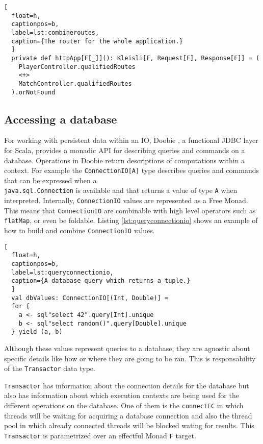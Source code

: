 \documentclass[../main.tex]{subfiles}
\begin{document}
\begin{lstlisting}[
  float=h,
  captionpos=b,
  label=lst:combineroutes,
  caption={The router for the whole application.}
  ]
  private def httpApp[F[_]](): Kleisli[F, Request[F], Response[F]] = (
    PlayerController.qualifiedRoutes
    <+>
    MatchController.qualifiedRoutes
  ).orNotFound
\end{lstlisting}

\subsection{Accessing a database}
For working with persistent data within an IO, Doobie \autocite{Norris2020Doobie}, a functional JDBC layer for Scala,
provides a monadic API for describing
queries and commands on a database. Operations in Doobie return descriptions of
computations within a context. For example the \texttt{ConnectionIO[A]} type
describes queries and commands that can be expressed when a\\
\texttt{java.sql.Connection} is available and that returns a value of type
\texttt{A} when interpreted. Internally, \texttt{ConnectionIO} values are represented as a
Free Monad. This means that \texttt{ConnectionIO} are combinable with high level
operators such as \texttt{flatMap}, or even be foldable. Listing \ref{lst:queryconnectionio} shows an
example of how to build and combine \texttt{ConnectionIO} values.

\begin{lstlisting}[
  float=h,
  captionpos=b,
  label=lst:queryconnectionio,
  caption={A database query which returns a tuple.}
  ]
  val dbValues: ConnectionIO[(Int, Double)] =
  for {
    a <- sql"select 42".query[Int].unique
    b <- sql"select random()".query[Double].unique
  } yield (a, b)
\end{lstlisting}

Although these values represent queries to a database, they are agnostic about
specific details like how or where they are going to be ran. This is
responsability of the \texttt{Transactor} data type.

\texttt{Transactor} has information about the connection details for the
database but also has information about which execution contexts are being used
for the different operations on the database. One of them is the
\texttt{connectEC} in which threads will be waiting for acquiring a database
connection and also the thread pool in which already connected threads will be
blocked wating for results. This \texttt{Transactor} is parametrized over an effectful
Monad \texttt{F} target.
\end{document}
